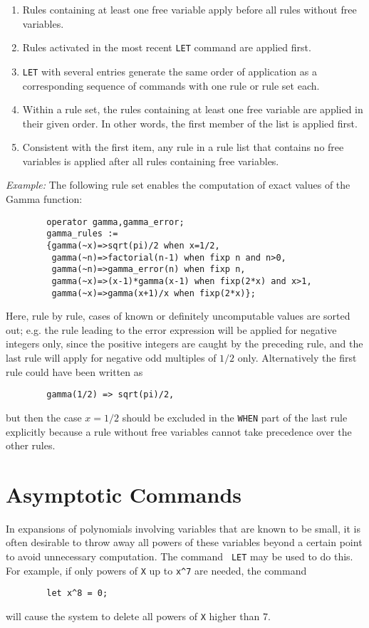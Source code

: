 \documentclass[11pt,letterpaper]{book}
\begin{document}
\begin{enumerate}
\item Rules containing at least one free variable apply before all rules
without free variables.
\item Rules activated in the most recent {\tt LET}
command are applied first.
\item {\tt LET} with several entries generate
the same order of application as a corresponding sequence of commands with
one rule or rule set each.
\item Within a rule set, the rules containing at least
one free variable are applied in their given order.
In other words, the first member of the list is applied first.
\item Consistent with the first item, any rule in a rule list that
contains no free variables is applied after all rules containing free
variables.
\end{enumerate}
{\it Example:} The following rule set enables the computation of exact
values of the Gamma function:
{\small\begin{verbatim}
        operator gamma,gamma_error;
        gamma_rules :=
        {gamma(~x)=>sqrt(pi)/2 when x=1/2,
         gamma(~n)=>factorial(n-1) when fixp n and n>0,
         gamma(~n)=>gamma_error(n) when fixp n,
         gamma(~x)=>(x-1)*gamma(x-1) when fixp(2*x) and x>1,
         gamma(~x)=>gamma(x+1)/x when fixp(2*x)};
\end{verbatim}}
Here, rule by rule, cases of known or definitely uncomputable values
are sorted out; e.g. the rule leading to the error expression
will be applied for negative integers only, since the positive
integers are caught by the preceding rule, and the
last rule will apply for negative odd multiples of $1/2$ only.
Alternatively the first rule could have been written as
{\small\begin{verbatim}
        gamma(1/2) => sqrt(pi)/2,
\end{verbatim}}
but then the case $x=1/2$ should be excluded in the {\tt WHEN} part of the
last rule explicitly because a rule without free variables cannot take
precedence over the other rules.

\section{Asymptotic Commands} 
\label{sec-asymp}
In expansions of polynomials involving variables that are known to be
small, it is often desirable to throw away all powers of these variables
beyond a certain point to avoid unnecessary computation.  The command {\tt
LET} may be used to do this.  For example, if only powers of {\tt X} up to
{\tt x\verb|^|7} are needed, the command
{\small\begin{verbatim}
        let x^8 = 0;
\end{verbatim}}
will cause the system to delete all powers of {\tt X} higher than 7.
\end{document}
